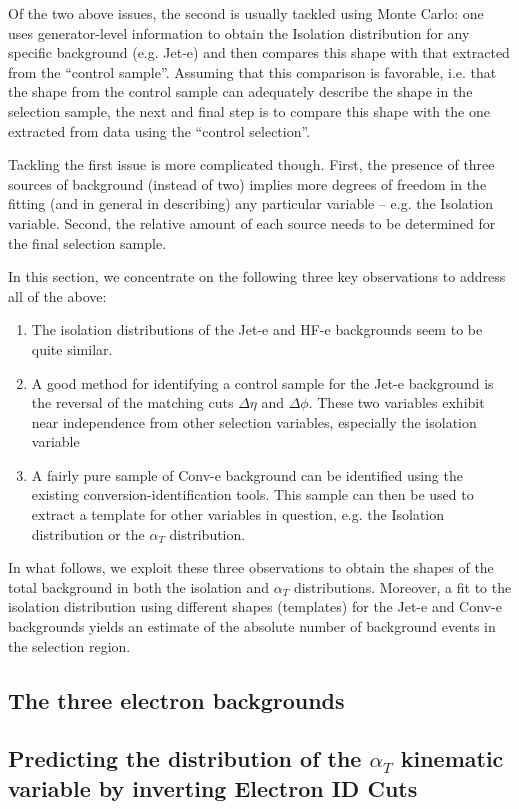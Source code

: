 Of the two above issues, the second is usually tackled using Monte Carlo: one uses generator-level information to obtain the Isolation distribution for any specific background (e.g. Jet-e) and then compares this shape with that extracted from the ``control sample''.  Assuming that this comparison is favorable, i.e. that the shape from the control sample can adequately describe the shape in the selection sample, the next and final step is to compare this shape with the one extracted from data using the ``control selection''.

Tackling the first issue is more complicated though. First, the presence of three sources of background (instead of two) implies more degrees of freedom in the fitting (and in general in describing) any particular variable -- e.g. the Isolation variable. Second, the relative amount of each source needs to be determined for the final selection sample.

In this section, we concentrate on the following three key observations to address all of the above:
\begin{enumerate}
\item The isolation distributions of the Jet-e and HF-e backgrounds seem to be quite similar.
\item A good method for identifying a control sample for the Jet-e background is the reversal of the matching cuts $\Delta\eta$ and $\Delta\phi$.  These two variables exhibit near independence from other selection variables, especially the isolation variable
\item A fairly pure sample of Conv-e background can be identified using the existing conversion-identification tools. This sample can then be used to extract a template for other variables in question, e.g. the Isolation distribution or the $\alpha_T$ distribution.
\end{enumerate}
In what follows, we exploit these three observations to obtain the shapes of the total background in both the isolation and $\alpha_T$ distributions.  Moreover, a fit to the isolation distribution using different shapes (templates) for the Jet-e and Conv-e backgrounds yields an estimate of the absolute number of background events in the selection region.

\subsection{The three electron backgrounds}


\subsection{Predicting the distribution of the $\alpha{_T}$ kinematic variable by inverting Electron ID Cuts}

